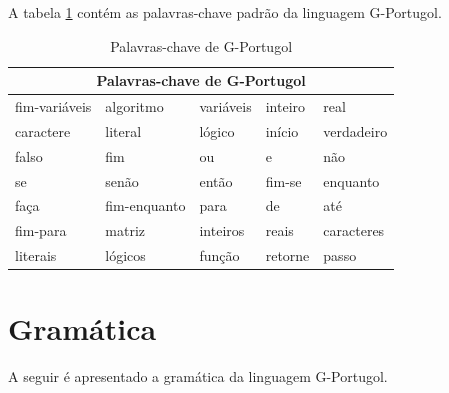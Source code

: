 \documentclass[a4paper,11pt]{report}
\begin{document}
A tabela \ref{tb_palavras_chave} contém as palavras-chave padrão da linguagem
G-Portugol.

\begin{table}[ht]
\begin{center}
  \begin{tabular}{|l l l l l|}
    \hline
    \multicolumn{5}{|c|}{Palavras-chave de G-Portugol} \\
    \hline
  fim-variáveis & algoritmo & variáveis & inteiro & real \\
  caractere & literal & lógico & início & verdadeiro \\
  falso & fim & ou & e & não \\
  se & senão & então & fim-se & enquanto \\
  faça & fim-enquanto & para & de & até \\
  fim-para & matriz & inteiros & reais & caracteres \\
  literais & lógicos & função & retorne & passo \\
  \hline
  \end{tabular}
  \caption{Palavras-chave de G-Portugol\label{tb_palavras_chave}}
\end{center}
\end{table}

\section{Gramática}

A seguir é apresentado a gramática da linguagem G-Portugol.
\end{document}
